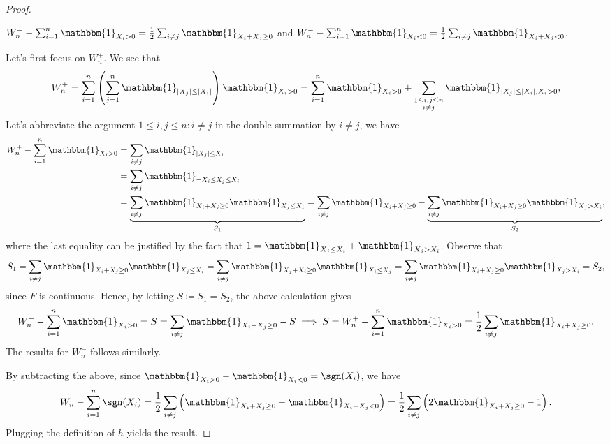 \begin{proof}
	\begin{claim}
		\(W_n^+ - \sum_{i=1}^{n} \mathbbm{1}_{X_i > 0} = \frac{1}{2} \sum_{i \neq j} \mathbbm{1}_{X_i + X_j \geq 0}\) and \(W_n^- - \sum_{i=1}^{n} \mathbbm{1}_{X_i < 0} = \frac{1}{2} \sum_{i \neq j} \mathbbm{1}_{X_i + X_j < 0}\).
	\end{claim}
	\begin{explanation}
		Let's first focus on \(W_n^+\). We see that
		\[
			W_n^+
			= \sum_{i=1}^{n} \left( \sum_{j=1}^{n} \mathbbm{1}_{\vert X_j \vert \leq \vert X_i \vert } \right) \mathbbm{1}_{X_i > 0}
			= \sum_{i=1}^{n} \mathbbm{1}_{X_i > 0} + \sum_{\substack{1 \leq i, j \leq n \\ i \neq j}} \mathbbm{1}_{\vert X_j \vert \leq \vert X_i \vert , X_i > 0} ,
		\]
		Let's abbreviate the argument \(1 \leq i, j \leq n \colon i \neq j\) in the double summation by \(i \neq j\), we have
		\[
			\begin{split}
				W_n^+ - \sum_{i=1}^{n} \mathbbm{1}_{X_i > 0}
				 & = \sum_{i \neq j} \mathbbm{1}_{\vert X_j \vert \leq X_i}                                       \\
				 & = \sum_{i \neq j} \mathbbm{1}_{-X_i \leq X_j \leq X_i}                                         \\
				 & = \underbrace{\sum_{i \neq j} \mathbbm{1}_{X_i + X_j \geq 0} \mathbbm{1}_{X_j \leq X_i}}_{S_1}
				= \sum_{i \neq j} \mathbbm{1}_{X_i + X_j \geq 0} - \underbrace{\sum_{i \neq j} \mathbbm{1}_{X_i + X_j \geq 0} \mathbbm{1}_{X_j > X_i}}_{S_2},
			\end{split}
		\]
		where the last equality can be justified by the fact that \(1 = \mathbbm{1}_{X_j \leq X_i} + \mathbbm{1}_{X_j > X_i} \). Observe that
		\[
			S_1
			= \sum_{i \neq j} \mathbbm{1}_{X_i + X_j \geq 0} \mathbbm{1}_{X_j \leq X_i}
			= \sum_{i \neq j} \mathbbm{1}_{X_j + X_i \geq 0} \mathbbm{1}_{X_i \leq X_j}
			= \sum_{i \neq j} \mathbbm{1}_{X_i + X_j \geq 0} \mathbbm{1}_{X_j > X_i}
			= S_2,
		\]
		since \(F\) is continuous. Hence, by letting \(S \coloneqq S_1 = S_2\), the above calculation gives
		\[
			W_n^+ - \sum_{i=1}^{n} \mathbbm{1}_{X_i > 0}
			= S
			= \sum_{i \neq j} \mathbbm{1}_{X_i + X_j \geq 0} - S
			\implies S
			= W_n^+ - \sum_{i=1}^{n} \mathbbm{1}_{X_i > 0}
			= \frac{1}{2} \sum_{i \neq j} \mathbbm{1}_{X_i + X_j \geq 0}.
		\]
		The results for \(W_n^-\) follows similarly.
	\end{explanation}

	By subtracting the above, since \(\mathbbm{1}_{X_i > 0} - \mathbbm{1}_{X_i < 0} = \sgn (X_i) \), we have
	\[
		W_n - \sum_{i=1}^{n} \sgn (X_i)
		= \frac{1}{2} \sum_{i \neq j} \left( \mathbbm{1}_{X_i + X_j \geq 0} - \mathbbm{1}_{X_i + X_j < 0} \right)
		= \frac{1}{2} \sum_{i \neq j} \left( 2 \mathbbm{1}_{X_i + X_j \geq 0} - 1 \right).
	\]
	Plugging the definition of \(h\) yields the result.
\end{proof}

